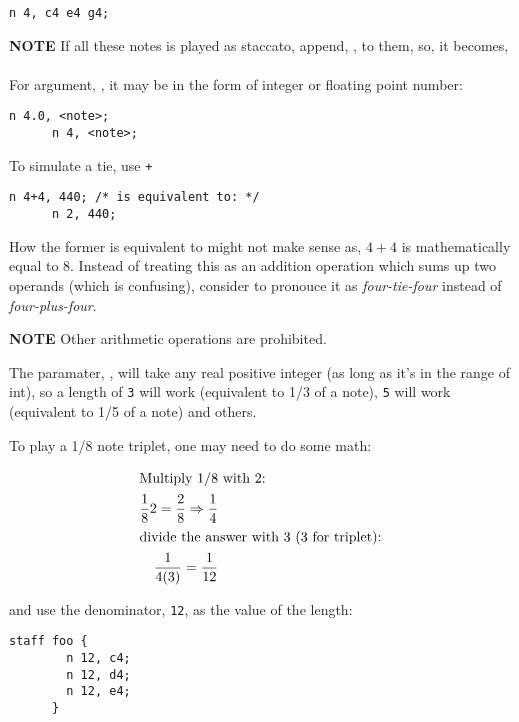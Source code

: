 \begin{Verbatim}[frame=single]
      n 4, c4 e4 g4;
\end{Verbatim}

\textbf{NOTE} If all these notes is played as staccato, append,
, to them, so, it becomes, 

\paragraph{} For argument, , it may be in the form of integer or floating point number:
\label{nlength}

\begin{Verbatim}[frame=single]
      n 4.0, <note>;
      n 4, <note>;
\end{Verbatim}

\np To simulate a tie, use \verb-+-

\begin{Verbatim}[frame=single]
      n 4+4, 440; /* is equivalent to: */
      n 2, 440; 
\end{Verbatim}

\np How the former is equivalent to  might
not make sense as, $4+4$ is mathematically equal to 8. Instead
of treating this as an addition operation which sums up two
operands (which is confusing), consider to pronouce it as
\textit{four-tie-four} instead of \textit{four-plus-four}.
 
\textbf{NOTE} Other arithmetic operations are prohibited.

\np The paramater, , will take any real positive integer (as long as it's in the range of int),
so a length of \verb+3+ will work (equivalent to 1/3 of a note), \verb+5+ will work (equivalent to 1/5
of a note) and others.

\np To play a 1/8 note triplet, one may need to do some math:

\begin{align}
	\shortintertext{Multiply 1/8 with 2:}
	\frac{1}{8}2 = \frac{2}{8} \Rightarrow \frac{1}{4} \\
	\shortintertext{divide the answer with 3 (3 for triplet):}
	\frac{1}{4(3)} = \frac{1}{12}
\end{align}

and use the denominator, \verb+12+, as the value of the length:
\begin{Verbatim}[frame=single]
      staff foo {
        n 12, c4;
        n 12, d4;
        n 12, e4;
      }
\end{Verbatim}

